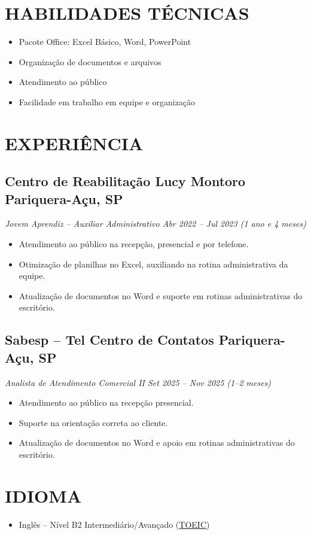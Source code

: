 \documentclass[a4paper,10pt]{article}
\begin{document}
\section{HABILIDADES TÉCNICAS}
\begin{itemize}
    \item Pacote Office: Excel Básico, Word, PowerPoint
    \item Organização de documentos e arquivos
    \item Atendimento ao público
    \item Facilidade em trabalho em equipe e organização
\end{itemize}

\section{EXPERIÊNCIA}

\subsection*{\texorpdfstring{
        \textbf{Centro de Reabilitação Lucy Montoro} \hfill Pariquera-Açu, SP
    }{
        Centro de Reabilitação Lucy Montoro
    }}
\textit{Jovem Aprendiz – Auxiliar Administrativo \hfill Abr 2022 – Jul 2023 (1 ano e 4 meses)}
\begin{itemize}
    \item Atendimento ao público na recepção, presencial e por telefone.
    \item Otimização de planilhas no Excel, auxiliando na rotina administrativa da equipe.
    \item Atualização de documentos no Word e suporte em rotinas administrativas do escritório.
\end{itemize}

\subsection*{\texorpdfstring{
        \textbf{Sabesp – Tel Centro de Contatos} \hfill Pariquera-Açu, SP
    }{
        Sabesp
    }}
\textit{Analista de Atendimento Comercial II \hfill Set 2025 – Nov 2025 (1–2 meses)}
\begin{itemize}
    \item Atendimento ao público na recepção presencial.
    \item Suporte na orientação correta ao cliente.
    \item Atualização de documentos no Word e apoio em rotinas administrativas do escritório.
\end{itemize}

\section{IDIOMA}
\begin{itemize}
    \item Inglês – Nível B2 Intermediário/Avançado (\href{https://drive.google.com/file/d/1wQA662aiYXgXoeTkIuQ1UzJLbKcqJmrU/view}{TOEIC})
\end{itemize}
\end{document}
